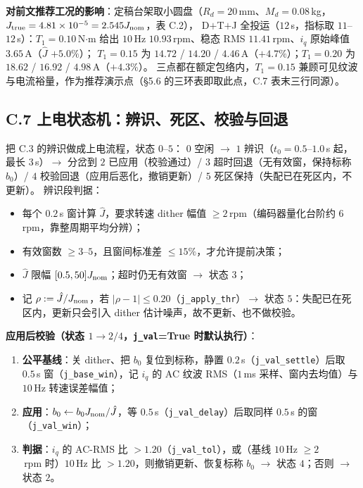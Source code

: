\documentclass[11pt,a4paper]{article}
\theoremstyle{remark}\newtheorem{remark}{注}
\begin{document}
\textbf{对前文推荐工况的影响}：定稿台架取小圆盘（$R_d=20$\,mm、$M_d=0.08$\,kg，$J_{\rm true}=4.81\times10^{-5}=2.545J_{\rm nom}$，表 C.2），
D$+$T$+$J 全投运（$12$\,s，指标取 $11$--$12$\,s）：$T_1=0.10$\,N$\cdot$m 给出 $10$\,Hz $10.93$\,rpm、稳态 RMS $11.41$\,rpm、$i_q$ 原始峰值 $3.65$\,A（$\hat J$ $+5.0\%$）；
$T_1=0.15$ 为 $14.72$ / $14.20$ / $4.46$\,A（$+4.7\%$）；$T_1=0.20$ 为 $18.62$ / $16.92$ / $4.98$\,A（$+4.3\%$）。
三点都在额定包络内，$T_1=0.15$ 兼顾可见纹波与电流裕量，作为推荐演示点（§5.6 的三环表即取此点，C.7 表末三行同源）。



\subsection*{C.7 上电状态机：辨识、死区、校验与回退}

把 C.3 的辨识做成上电流程，状态 $0$--$5$：
$0$ 空闲 $\to$ $1$ 辨识（$t_0=0.5$--$1.0$\,s 起，最长 $3$\,s）$\to$ 分岔到 $2$ 已应用（校验通过）/
$3$ 超时回退（无有效窗，保持标称 $b_0$）/
$4$ 校验回退（应用后恶化，撤销更新）/
$5$ 死区保持（失配已在死区内，不更新）。
辨识段判据：
\begin{itemize}
  \item 每个 $0.2$\,s 窗计算 $\hat J$，要求转速 dither 幅值 $\ge2$\,rpm（编码器量化台阶约 $6$\,rpm，靠整周期平均分辨）；
  \item 有效窗数 $\ge3$--$5$，且窗间标准差 $\le15\%$，才允许提前决策；
  \item $\hat J$ 限幅 $[0.5,50]J_{\rm nom}$；超时仍无有效窗 $\to$ 状态 $3$；
  \item 记 $\rho:=\hat J/J_{\rm nom}$，若 $|\rho-1|\le0.20$（\texttt{j\_apply\_thr}）$\to$ 状态 $5$：失配已在死区内，更新只会引入 dither 估计噪声，故不更新、也不做校验。
\end{itemize}

\textbf{应用后校验（状态 $1\to2/4$，\texttt{j\_val}=True 时默认执行）}：
\begin{enumerate}
  \item \textbf{公平基线}：关 dither、把 $b_0$ 复位到标称，静置 $0.2$\,s（\texttt{j\_val\_settle}）后取 $0.5$\,s 窗（\texttt{j\_base\_win}），记 $i_q$ 的 AC 纹波 RMS（$1$\,ms 采样、窗内去均值）与 $10$\,Hz 转速误差幅值；
  \item \textbf{应用}：$b_0\leftarrow b_0J_{\rm nom}/\hat J$，等 $0.5$\,s（\texttt{j\_val\_delay}）后取同样 $0.5$\,s 的窗（\texttt{j\_val\_win}）；
  \item \textbf{判据}：$i_q$ 的 AC-RMS 比 $>1.20$（\texttt{j\_val\_tol}），或（基线 $10$\,Hz $\ge2$\,rpm 时）$10$\,Hz 比 $>1.20$，则撤销更新、恢复标称 $b_0$ $\to$ 状态 $4$；否则 $\to$ 状态 $2$。
\end{enumerate}
\end{document}

